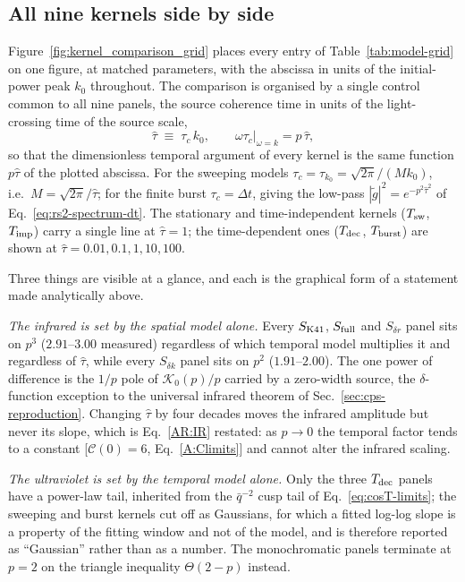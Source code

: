 \documentclass[10pt,prd,aps,nobibnotes,superscriptaddress,preprintnumbers,notitlepage]{revtex4-1}
\begin{document}
\subsection{All nine kernels side by side}
\label{sec:kernel-grid}

Figure~\ref{fig:kernel_comparison_grid} places every entry of
Table~\ref{tab:model-grid} on one figure, at matched parameters, with the
abscissa in units of the initial-power peak $k_0$ throughout. The comparison is
organised by a single control common to all nine panels, the source coherence
time in units of the light-crossing time of the source scale,
\begin{equation}
  \hat\tau \;\equiv\; \tau_c\,k_0 ,
  \qquad
  \omega\tau_c\big|_{\omega=k}=p\,\hat\tau ,
  \label{eq:that}
\end{equation}
so that the dimensionless temporal argument of every kernel is the same
function $p\hat\tau$ of the plotted abscissa. For the sweeping models
$\tau_c=\tau_{k_0}=\sqrt{2\pi}/(Mk_0)$, i.e.\ $M=\sqrt{2\pi}/\hat\tau$; for the
finite burst $\tau_c=\Delta t$, giving the low-pass $|\tilde
g|^2=e^{-p^2\hat\tau^2}$ of Eq.~\eqref{eq:rs2-spectrum-dt}. The stationary and
time-independent kernels ($T_{\rm sw}$, $T_{\rm imp}$) carry a single line at
$\hat\tau=1$; the time-dependent ones ($T_{\rm dec}$, $T_{\rm burst}$) are shown
at $\hat\tau=0.01,0.1,1,10,100$.

Three things are visible at a glance, and each is the graphical form of a
statement made analytically above.

\emph{The infrared is set by the spatial model alone.} Every $S_{\rm K41}$,
$S_{\rm full}$ and $S_{\delta r}$ panel sits on $p^{3}$ ($2.91$--$3.00$
measured) regardless of which temporal model multiplies it and regardless of
$\hat\tau$, while every $S_{\delta k}$ panel sits on $p^{2}$ ($1.91$--$2.00$).
The one power of difference is the $1/p$ pole of $\mathcal{K}_0(p)/p$ carried by
a zero-width source, the $\delta$-function exception to the universal infrared
theorem of Sec.~\ref{sec:cps-reproduction}. Changing $\hat\tau$ by four decades
moves the infrared amplitude but never its slope, which is
Eq.~\eqref{AR:IR} restated: as $p\to0$ the temporal factor tends to a constant
[$\mathcal{C}(0)=6$, Eq.~\eqref{A:Climits}] and cannot alter the infrared
scaling.

\emph{The ultraviolet is set by the temporal model alone.} Only the three
$T_{\rm dec}$ panels have a power-law tail, inherited from the
$\bar q^{-2}$ cusp tail of Eq.~\eqref{eq:cosT-limits}; the sweeping and burst
kernels cut off as Gaussians, for which a fitted log-log slope is a property of
the fitting window and not of the model, and is therefore reported as
``Gaussian'' rather than as a number. The monochromatic panels terminate
at $p=2$ on the triangle inequality $\Theta(2-p)$ instead.
\end{document}
